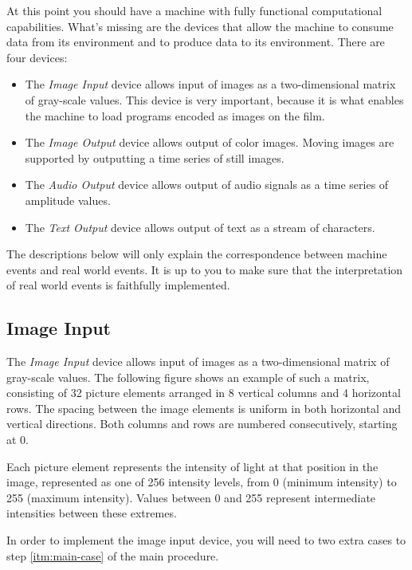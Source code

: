 \documentclass[a4paper,11pt]{article}
\begin{document}
At this point you should have a machine with fully functional computational capabilities.
What's missing are the devices that allow the machine to consume data from its environment and to produce data to its environment.
There are four devices:
\begin{itemize}
\item The \emph{Image Input} device allows input of images as a two-dimensional matrix of gray-scale values.
  This device is very important, because it is what enables the machine to load programs encoded as images on the film.
\item The \emph{Image Output} device allows output of color images.
  Moving images are supported by outputting a time series of still images.
\item The \emph{Audio Output} device allows output of audio signals as a time series of amplitude values.
\item The \emph{Text Output} device allows output of text as a stream of characters.
\end{itemize}
The descriptions below will only explain the correspondence between machine events and real world events.
It is up to you to make sure that the interpretation of real world events is faithfully implemented.

\subsection{Image Input}

The \emph{Image Input} device allows input of images as a two-dimensional matrix of gray-scale values.
The following figure shows an example of such a matrix, consisting of 32 picture elements arranged in 8 vertical columns and 4 horizontal rows.
The spacing between the image elements is uniform in both horizontal and vertical directions.
Both columns and rows are numbered consecutively, starting at 0.
\begin{center}
\end{center}
Each picture element represents the intensity of light at that position in the image, represented as one of 256 intensity levels, from 0 (minimum intensity) to 255 (maximum intensity).
Values between 0 and 255 represent intermediate intensities between these extremes.

In order to implement the image input device, you will need to two extra cases to step \ref{itm:main-case} of the main procedure.
\end{document}
